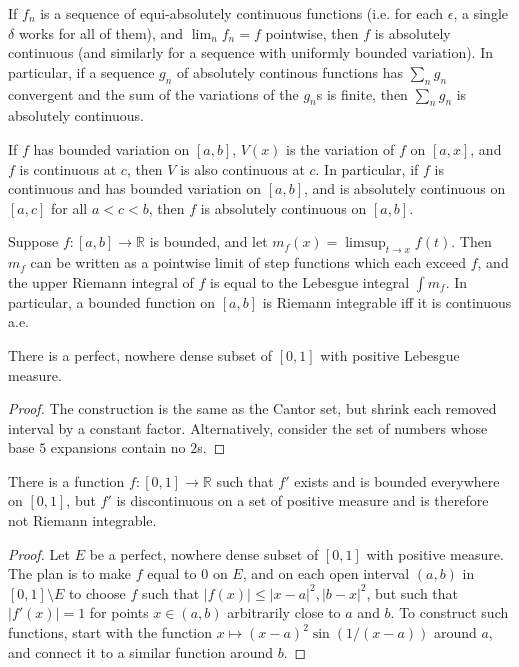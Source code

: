 \begin{prop} If $f_n$ is a sequence of equi-absolutely continuous functions (i.e. for each $\epsilon$, a single $\delta$ works for all of them), and $\lim_n f_n = f$ pointwise, then $f$ is absolutely continuous (and similarly for a sequence with uniformly bounded variation). In particular, if a sequence $g_n$ of absolutely continous functions has $\sum_n g_n$ convergent and the sum of the variations of the $g_n$s is finite, then $\sum_n g_n$ is absolutely continuous.
\end{prop}

\begin{prop} If $f$ has bounded variation on $[a,b]$, $V(x)$ is the variation of $f$ on $[a,x]$, and $f$ is continuous at $c$, then $V$ is also continuous at $c$. In particular, if $f$ is continuous and has bounded variation on $[a,b]$, and is absolutely continuous on $[a,c]$ for all $a<c<b$, then $f$ is absolutely continuous on $[a,b]$.
\end{prop}

\begin{prop} Suppose $f:[a,b] \rightarrow \mathbb{R}$ is bounded, and let $m_f(x) = \limsup_{t\rightarrow x} f(t)$. Then $m_f$ can be written as a pointwise limit of step functions which each exceed $f$, and the upper Riemann integral of $f$ is equal to the Lebesgue integral $\int m_f$. In particular, a bounded function on $[a,b]$ is Riemann integrable iff it is continuous a.e.
\end{prop}

\begin{prop} There is a perfect, nowhere dense subset of $[0,1]$ with positive Lebesgue measure.
\end{prop}
\begin{proof} The construction is the same as the Cantor set, but shrink each removed interval by a constant factor. Alternatively, consider the set of numbers whose base $5$ expansions contain no $2$s.
\end{proof}

\begin{prop} There is a function $f:[0,1] \rightarrow \mathbb{R}$ such that $f'$ exists and is bounded everywhere on $[0,1]$, but $f'$ is discontinuous on a set of positive measure and is therefore not Riemann integrable.
\end{prop}
\begin{proof} Let $E$ be a perfect, nowhere dense subset of $[0,1]$ with positive measure. The plan is to make $f$ equal to $0$ on $E$, and on each open interval $(a,b)$ in $[0,1]\setminus E$ to choose $f$ such that $|f(x)| \le |x-a|^2, |b-x|^2$, but such that $|f'(x)| = 1$ for points $x \in (a,b)$ arbitrarily close to $a$ and $b$. To construct such functions, start with the function $x \mapsto (x-a)^2\sin(1/(x-a))$ around $a$, and connect it to a similar function around $b$.
\end{proof}

